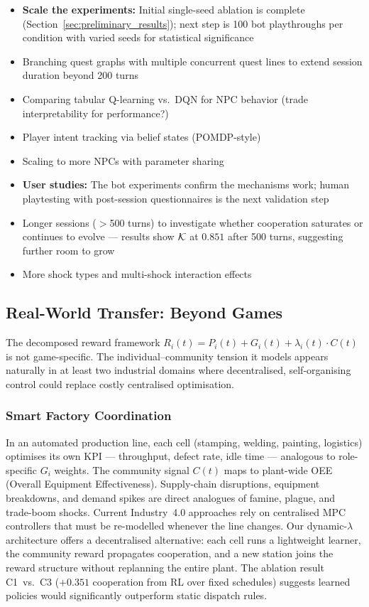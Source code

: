 \begin{itemize}
    \item \textbf{Scale the experiments:} Initial single-seed ablation is complete (Section~\ref{sec:preliminary_results}); next step is 100 bot playthroughs per condition with varied seeds for statistical significance
    \item Branching quest graphs with multiple concurrent quest lines to extend session duration beyond 200 turns
    \item Comparing tabular Q-learning vs.\ DQN for NPC behavior (trade interpretability for performance?)
    \item Player intent tracking via belief states (POMDP-style)
    \item Scaling to more NPCs with parameter sharing
    \item \textbf{User studies:} The bot experiments confirm the mechanisms work; human playtesting with post-session questionnaires is the next validation step
    \item Longer sessions ($>$500 turns) to investigate whether cooperation saturates or continues to evolve --- results show $\mathcal{K}$ at $0.851$ after 500 turns, suggesting further room to grow
    \item More shock types and multi-shock interaction effects
\end{itemize}

\subsection{Real-World Transfer: Beyond Games}

The decomposed reward framework $R_i(t) = P_i(t) + G_i(t) + \lambda_i(t) \cdot C(t)$ is not game-specific. The individual--community tension it models appears naturally in at least two industrial domains where decentralised, self-organising control could replace costly centralised optimisation.

\subsubsection{Smart Factory Coordination}
In an automated production line, each cell (stamping, welding, painting, logistics) optimises its own KPI --- throughput, defect rate, idle time --- analogous to role-specific $G_i$ weights. The community signal $C(t)$ maps to plant-wide OEE (Overall Equipment Effectiveness). Supply-chain disruptions, equipment breakdowns, and demand spikes are direct analogues of famine, plague, and trade-boom shocks. Current Industry~4.0 approaches rely on centralised MPC controllers that must be re-modelled whenever the line changes. Our dynamic-$\lambda$ architecture offers a decentralised alternative: each cell runs a lightweight learner, the community reward propagates cooperation, and a new station joins the reward structure without replanning the entire plant. The ablation result C1~vs.~C3 ($+0.351$ cooperation from RL over fixed schedules) suggests learned policies would significantly outperform static dispatch rules.

